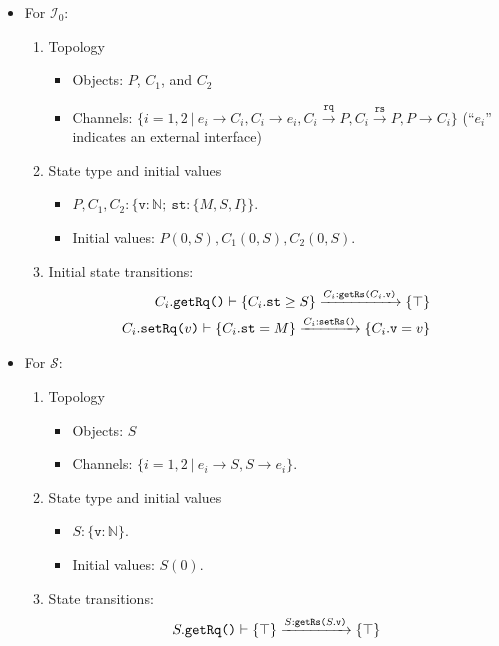 \documentclass[format=manuscript]{acmart}
\begin{document}
\begin{itemize}
\item For $\mathcal{I}_0$:
  \begin{enumerate}
  \item Topology
    \begin{itemize}
    \item Objects: $P$, $C_1$, and $C_2$
    \item Channels: $\{ i = 1,2\ |\ e_i \rightarrow C_i, C_i \rightarrow e_i,
      C_i \xrightarrow{\texttt{rq}} P, C_i \xrightarrow{\texttt{rs}} P, P
      \rightarrow C_i \}$ (``$e_i$'' indicates an external interface)
    \end{itemize}
  \item State type and initial values
    \begin{itemize}
    \item $P, C_1, C_2: \{ \texttt{v}: \mathbb{N};\ \texttt{st}: \{M, S, I\} \}$.
    \item Initial values: $P(0, S), C_1(0, S), C_2(0, S)$.
    \end{itemize}
  \item Initial state transitions:
    \begin{eqnarray}
      C_i.\texttt{getRq()}\vdash \{ C_i.\texttt{st} \geq S \} \xrightarrow{C_i:\texttt{getRs(}C_i.\texttt{v}\texttt{)}} \{ \top \} \label{trs1} \\
      C_i.\texttt{setRq(}v\texttt{)}\vdash \{ C_i.\texttt{st} = M \} \xrightarrow{C_i:\texttt{setRs()}} \{ C_i.\texttt{v} = v \} \label{trs2}
    \end{eqnarray}
  \end{enumerate}
\item For $\mathcal{S}$:
  \begin{enumerate}
  \item Topology
    \begin{itemize}
    \item Objects: $S$
    \item Channels: $\{ i = 1,2\ |\ e_i \rightarrow S, S \rightarrow e_i \}$.
    \end{itemize}
  \item State type and initial values
    \begin{itemize}
    \item $S: \{ \texttt{v}: \mathbb{N} \}$.
    \item Initial values: $S(0)$.
    \end{itemize}
  \item State transitions:
    \begin{eqnarray}
      \msgrule{\objGetRq{S}}{\top}{\objGetRs{S}{\valOf{S}}}{\top} \label{trs3} \\

\end{eqnarray}
\end{enumerate}
\end{itemize}
\end{document}
